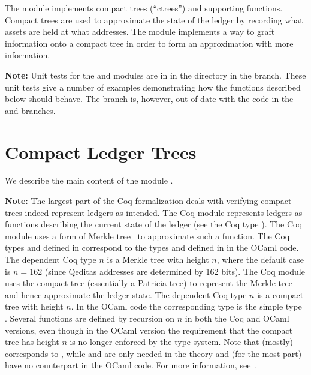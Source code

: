 The {} module
implements compact trees (``ctrees'')
and supporting functions.
Compact trees are used to approximate the state of the ledger
by recording what assets are held at what addresses.
The {} module
implements a way to graft information onto a compact
tree in order to form an approximation with more information.

{\bf{Note:}} Unit tests for the {} and {} modules are in {}
in the {}
directory in the {} branch.
These unit tests give a number of examples demonstrating how the functions described below should behave.
The {} branch is, however, out of date with the code in the {} and {} branches.

\section{Compact Ledger Trees}

We describe the main content of the module {}.

{\bf{Note:}} The largest part of the Coq formalization deals with verifying compact trees
indeed represent ledgers as intended.
The Coq module {} represents ledgers as functions
describing the current state of the ledger (see the Coq type ).
The Coq module {} uses a form of Merkle tree~\cite{Merkle1980} to approximate such a
{} function.
The Coq types {} and {} defined in {} correspond to 
the types {} and {} defined in {} in the OCaml code.
The dependent Coq type {} $n$ is a Merkle tree with height $n$,
where the default case is $n=162$ (since Qeditas addresses are determined by 162 bits).
The Coq module {} uses the compact tree (essentially a Patricia tree)
to represent the Merkle tree and hence approximate the ledger state.
The dependent Coq type {} $n$ is a compact tree with height $n$.
In the OCaml code the corresponding type is the simple type {}.
Several functions are defined by recursion on $n$ in both the Coq and OCaml versions,
even though in the OCaml version the requirement that the compact tree has height $n$
is no longer enforced by the type system.
Note that {} (mostly) corresponds to {},
while {} and {} are only needed in the theory
and (for the most part) have no counterpart in the OCaml code.
For more information, see~\cite{White2015b}.

